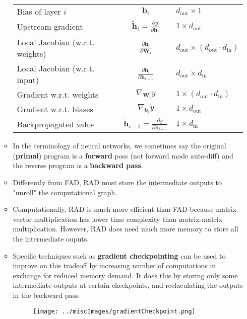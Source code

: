 \documentclass{article}
\newcommand{\tbf}[1]{\textbf{#1}}
\begin{document}
\begin{itemize}
\begin{itemize}
\begin{table}[H]
\begin{tabular}{l c l}
Bias of layer $i$              & $\mathbf{b}_i$                         & $d_{\text{out}} \times 1$ \\
Upstream gradient              & $\tilde{\mathbf{h}}_i = \frac{\partial y}{\partial \mathbf{h}_i}$ & $1 \times d_{\text{out}}$ \\
Local Jacobian (w.r.t. weights)& $\frac{\partial \mathbf{h}_i}{\partial \mathbf{W}_i}$ & $d_{\text{out}} \times (d_{\text{out}} \cdot d_{\text{in}})$ \\
Local Jacobian (w.r.t. input)  & $\frac{\partial \mathbf{h}_i}{\partial \mathbf{h}_{i-1}}$ & $d_{\text{out}} \times d_{\text{in}}$ \\
Gradient w.r.t. weights        & $\nabla_{\mathbf{W}_i} y$              & $1 \times (d_{\text{out}} \cdot d_{\text{in}})$ \\
Gradient w.r.t. biases         & $\nabla_{\mathbf{b}_i} y$              & $1 \times d_{\text{out}}$ \\
Backpropagated value           & $\tilde{\mathbf{h}}_{i-1} = \frac{\partial y}{\partial \mathbf{h}_{i-1}}$ & $1 \times d_{\text{in}}$ \\
\end{tabular}
\end{table}
        \item In the terminology of neural networks, we sometimes say the original (\tbf{primal}) program is a \tbf{forward} poss (not forward mode auto-diff) and the reverse program is a \tbf{backward pass}.
        \item Differently from FAD, RAD must store the intermediate outputs to "unroll" the computational graph. 
        \item Computationally, RAD is much more efficient than FAD because matrix-vector multiplication has lower time complexity than matrix-matrix multiplication. However, RAD does need much more memory to store all the intermediate ouputs. 
        \item Specific techniques such as \tbf{gradient checkpointing} can be used to improve on this tradeoff by increasing number of computations in exchange for reduced memory demand. It does this by storing only some intermediate outputs at certain checkpoints, and reclaculating the outputs in the backward pass. 
        \begin{figure}[H]
            \centering
            \texttt{[image: ../miscImages/gradientCheckpoint.png]} 
            \label{fig:example}
        \end{figure}
    \end{itemize}
\end{itemize}
\end{document}
